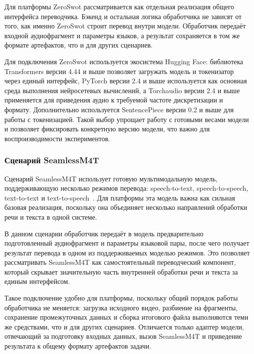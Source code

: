 \documentclass[a4paper,article,14pt]{extarticle}
\begin{document}
Для платформы ZeroSwot рассматривается как отдельная реализация общего интерфейса переводчика. Бэкенд и остальная логика обработчика не зависят от того, как именно ZeroSwot строит перевод внутри модели. Обработчик передаёт входной аудиофрагмент и параметры языков, а результат сохраняется в том же формате артефактов, что и для других сценариев.

Для подключения ZeroSwot используется экосистема Hugging Face: библиотека Transformers версии 4.44 и выше позволяет загружать модель и токенизатор через единый интерфейс, PyTorch версии 2.4 и выше используется как основная среда выполнения нейросетевых вычислений, а Torchaudio версии 2.4 и выше применяется для приведения аудио к требуемой частоте дискретизации и формату. Дополнительно используется SentencePiece версии 0.2 и выше для работы с токенизацией. Такой выбор упрощает работу с готовыми весами модели и позволяет фиксировать конкретную версию модели, что важно для воспроизводимости экспериментов.

\subsubsection{Сценарий SeamlessM4T}

Сценарий SeamlessM4T использует готовую мультимодальную модель, поддерживающую несколько режимов перевода: speech-to-text, speech-to-speech, text-to-text и text-to-speech~\cite{SeamlessM4T}. Для платформы эта модель важна как сильная базовая реализация, поскольку она объединяет несколько направлений обработки речи и текста в одной системе.

В данном сценарии обработчик передаёт в модель предварительно подготовленный аудиофрагмент и параметры языковой пары, после чего получает результат перевода в одном из поддерживаемых моделью режимов. Это позволяет рассматривать SeamlessM4T как самостоятельный переводческий компонент, который скрывает значительную часть внутренней обработки речи и текста за единым интерфейсом.

Такое подключение удобно для платформы, поскольку общий порядок работы обработчика не меняется: загрузка исходного видео, разбиение на фрагменты, сохранение промежуточных данных и сборка итогового файла выполняются теми же средствами, что и для других сценариев. Отличается только адаптер модели, отвечающий за подготовку входных данных, вызов SeamlessM4T и приведение результата к общему формату артефактов задачи.
\end{document}
